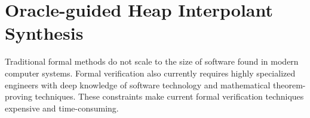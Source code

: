 \section{Oracle-guided Heap Interpolant Synthesis}
Traditional formal methods do not scale to the size of software found in modern computer systems. Formal verification also currently requires highly specialized engineers with deep knowledge of software technology and mathematical theorem-proving techniques. These constraints make current formal verification techniques expensive and time-consuming.
